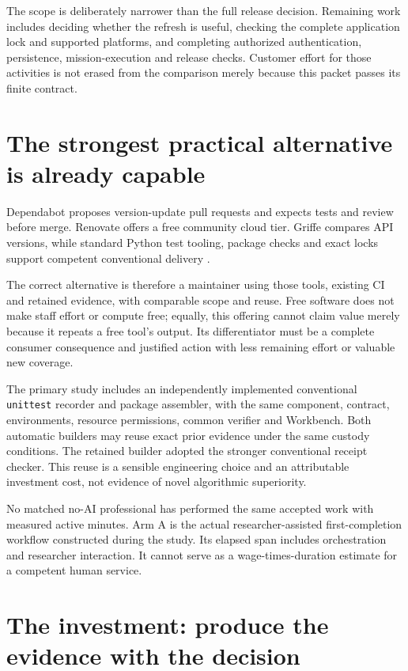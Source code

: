 \documentclass[11pt,letterpaper]{article}
\begin{document}
The scope is deliberately narrower than the full release decision. Remaining work includes deciding whether the refresh is useful, checking the complete application lock and supported platforms, and completing authorized authentication, persistence, mission-execution and release checks. Customer effort for those activities is not erased from the comparison merely because this packet passes its finite contract.

\section{The strongest practical alternative is already capable}
Dependabot proposes version-update pull requests and expects tests and review before merge. Renovate offers a free community cloud tier. Griffe compares API versions, while standard Python test tooling, package checks and exact locks support competent conventional delivery \cite{dependabot,renovate,griffe,uv,pip}.

The correct alternative is therefore a maintainer using those tools, existing CI and retained evidence, with comparable scope and reuse. Free software does not make staff effort or compute free; equally, this offering cannot claim value merely because it repeats a free tool's output. Its differentiator must be a complete consumer consequence and justified action with less remaining effort or valuable new coverage.

The primary study includes an independently implemented conventional \texttt{unittest} recorder and package assembler, with the same component, contract, environments, resource permissions, common verifier and Workbench. Both automatic builders may reuse exact prior evidence under the same custody conditions. The retained builder adopted the stronger conventional receipt checker. This reuse is a sensible engineering choice and an attributable investment cost, not evidence of novel algorithmic superiority.

No matched no-AI professional has performed the same accepted work with measured active minutes. Arm A is the actual researcher-assisted first-completion workflow constructed during the study. Its elapsed span includes orchestration and researcher interaction. It cannot serve as a wage-times-duration estimate for a competent human service.

\section{The investment: produce the evidence with the decision}
\end{document}
